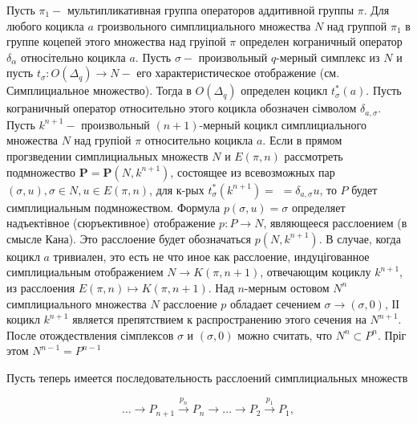 \documentclass[10pt]{article}
\begin{document}
Пусть $\pi_{1}-$ мультипликативная группа операторов аддитивной группы $\pi$. Для любого коцикла $a$ гроизвольного симплициального множества $N$ над группой $\pi_{1}$ в группе коцепей этого множества над груіпой $\pi$ определен кограничный оператор $\delta_{\alpha}$ относітельно коцикла $a$. Пусть $\sigma-$ произвольный $q$-мерный симплекс из $N$ и пусть $t_{\sigma}: O\left(\Delta_{q}\right) \rightarrow N-$ его характеристическое отображение (см. Симплициальное множество). Тогда в $O\left(\Delta_{q}\right)$ определен коцикл $t_{\sigma}^{*}(a)$. Пусть кограничный оператор относительно этого коцикла обозначен сімволом $\delta_{a, \sigma}$. Пусть $k^{n+1}-$ произвольный $(n+1)$-мерный коцикл симплициального множества $N$ над групіой $\pi$ относительно коцикла $a$. Если в прямом прогзведении симплициальных множеств $N$ и $E(\pi, n)$ рассмотреть подмножество $\boldsymbol{P}=\boldsymbol{P}\left(N, k^{n+1}\right)$, состоящее из всевозможных пар $(\sigma, u), \sigma \in N, u \in E(\pi, n)$, для к-рых $t_{\sigma}^{*}\left(k^{n+1}\right)=$ $=\delta_{a, \sigma} u$, то $P$ будет симплициальным подмножеством. Формула $p(\sigma, u)=\sigma$ определяет надъектівное (сюръективное) отображение $p: P \rightarrow N$, являющееся расслоением (в смысле Кана). Это расслоение будет обозначаться $p\left(N, k^{n+1}\right)$. В случае, когда коцикл $a$ тривиален, это есть не что иное как расслоение, индуцігованное симплициальным отображением $N \rightarrow K(\pi, n+1)$, отвечающим коциклу $k^{n+1}$, из расслоения $E(\pi, n) \mapsto K(\pi, n+1)$. Над $n$-мерным остовом $N^{n}$ симплициального множества $N$ расслоение $p$ обладает сечением $\sigma \rightarrow(\sigma, 0)$, ІІ коцикл $k^{n+1}$ является препятствием к распространению этого сечения на $N^{n+1}$. После отождествления сімплексов $\sigma$ и $(\sigma, 0)$ можно считать, что $N^{n} \subset P^{n}$. Пріг этом $N^{n-1}=P^{n-1}$



Пусть теперь имеется последовательность расслоений симплициальных множеств



\[

\ldots \longrightarrow P_{n+1} \stackrel{p_{n}}{\longrightarrow} P_{n} \longrightarrow \ldots \longrightarrow P_{2} \stackrel{p_{1}}{\longrightarrow} P_{1},

\]
\end{document}
